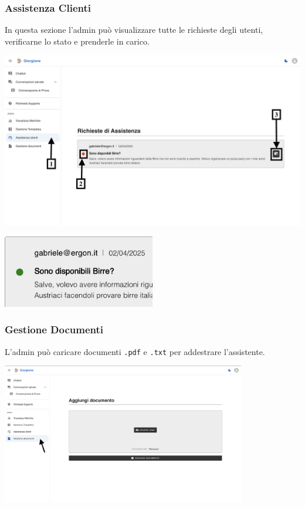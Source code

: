 \subsubsection{Assistenza Clienti}
In questa sezione l’admin può visualizzare tutte le richieste degli utenti, verificarne lo stato e prenderle in carico.
\begin{center}
    \includegraphics[width=\textwidth]{./img/Assistenza1.png}
    \label{fig:Assistenza1}
\end{center}

\begin{center}
    \includegraphics[width=0.5\textwidth]{./img/Assistenza2.png}
\end{center}

\subsubsection{Gestione Documenti}
L'admin può caricare documenti \texttt{.pdf} e \texttt{.txt} per addestrare l’assistente.
\begin{center}
    \includegraphics[width=0.8\textwidth]{./img/PaginaGestioneDocumenti1.png}
    \label{fig:gestione1}
\end{center}

